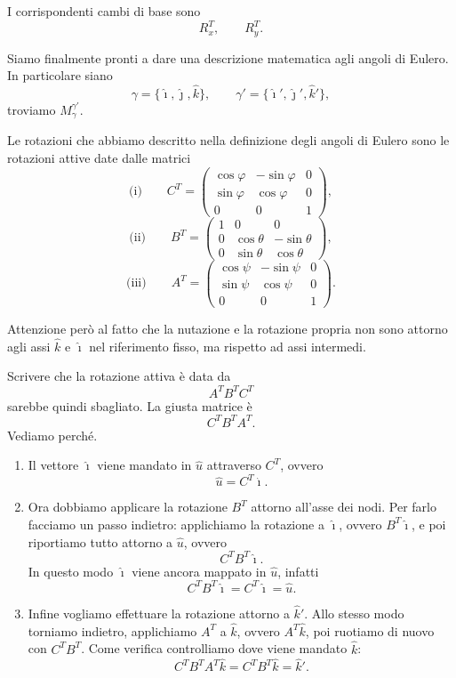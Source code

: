 I corrispondenti cambi di base sono
\[
R_x^T,
\qquad
R_y^T.
\]

Siamo finalmente pronti a dare una descrizione matematica agli angoli di Eulero. In particolare siano
\[
\gamma=\{\hat{\imath},\hat{\jmath},\hat{k}\},
\qquad
\gamma'=\{\hat{\imath}',\hat{\jmath}',\hat{k}'\},
\]
troviamo $M_{\gamma}^{\gamma'}$.

Le rotazioni che abbiamo descritto nella definizione degli angoli di Eulero sono le rotazioni attive date dalle matrici
\[
\text{(i)} \qquad
C^T=
\begin{pmatrix}
\cos\varphi & -\sin\varphi & 0\\
\sin\varphi & \cos\varphi & 0\\
0 & 0 & 1
\end{pmatrix},
\]
\[
\text{(ii)} \qquad
B^T=
\begin{pmatrix}
1 & 0 & 0\\
0 & \cos\theta & -\sin\theta\\
0 & \sin\theta & \cos\theta
\end{pmatrix},
\]
\[
\text{(iii)} \qquad
A^T=
\begin{pmatrix}
\cos\psi & -\sin\psi & 0\\
\sin\psi & \cos\psi & 0\\
0 & 0 & 1
\end{pmatrix}.
\]

Attenzione però al fatto che la nutazione e la rotazione propria non sono attorno agli assi $\hat{k}$ e $\hat{\imath}$ nel riferimento fisso, ma rispetto ad assi intermedi.

Scrivere che la rotazione attiva è data da
\[
A^TB^TC^T
\]
sarebbe quindi sbagliato. La giusta matrice è
\[
C^TB^TA^T.
\]
Vediamo perché.

\begin{enumerate}[label=\roman*)]
\item Il vettore $\hat{\imath}$ viene mandato in $\hat{u}$ attraverso $C^T$, ovvero
\[
\hat{u}=C^T\hat{\imath}.
\]

\item Ora dobbiamo applicare la rotazione $B^T$ attorno all'asse dei nodi. Per farlo facciamo un passo indietro: applichiamo la rotazione a $\hat{\imath}$, ovvero $B^T\hat{\imath}$, e poi riportiamo tutto attorno a $\hat{u}$, ovvero
\[
C^TB^T\hat{\imath}.
\]
In questo modo $\hat{\imath}$ viene ancora mappato in $\hat{u}$, infatti
\[
C^TB^T\hat{\imath}
=
C^T\hat{\imath}
=
\hat{u}.
\]

\item Infine vogliamo effettuare la rotazione attorno a $\hat{k}'$. Allo stesso modo torniamo indietro, applichiamo $A^T$ a $\hat{k}$, ovvero $A^T\hat{k}$, poi ruotiamo di nuovo con $C^TB^T$. Come verifica controlliamo dove viene mandato $\hat{k}$:
\[
C^TB^TA^T\hat{k}
=
C^TB^T\hat{k}
=
\hat{k}'.
\]
\end{enumerate}

